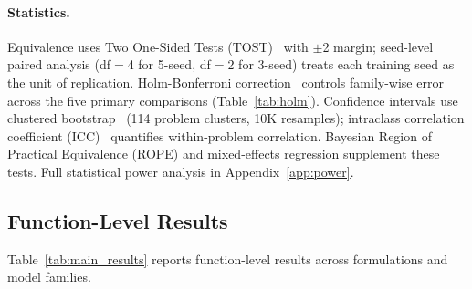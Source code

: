 \paragraph{Statistics.}
Equivalence uses Two One-Sided Tests (TOST)~\cite{schuirmann1987tost} with $\pm$2\pp{} margin; seed-level paired analysis (df${=}$4 for 5-seed, df${=}$2 for 3-seed) treats each training seed as the unit of replication. Holm-Bonferroni correction~\cite{holm1979} controls family-wise error across the five primary comparisons (Table~\ref{tab:holm}). Confidence intervals use clustered bootstrap~\cite{davison1997bootstrap} (114 problem clusters, 10K resamples); intraclass correlation coefficient (ICC)~\cite{shrout1979icc} quantifies within-problem correlation. Bayesian Region of Practical Equivalence (ROPE) and mixed-effects regression supplement these tests. Full statistical power analysis in Appendix~\ref{app:power}.


\subsection{Function-Level Results}
\label{sec:func_results}

Table~\ref{tab:main_results} reports function-level results across formulations and model families.

